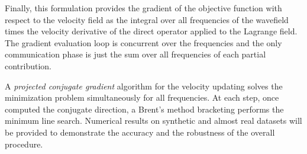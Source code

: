 \documentclass{report}
\begin{document}
Finally, this formulation provides the
gradient of the objective function with respect to the velocity field as the
integral over all frequencies of the wavefield times the velocity derivative of
the direct operator applied to the Lagrange field. The gradient evaluation loop
is concurrent over the frequencies and the only communication phase is just the
sum over all frequencies of each partial contribution.

A {\em projected conjugate gradient} algorithm for the velocity updating solves
the minimization problem simultaneously for all frequencies. At each step, once
computed the conjugate direction, a Brent's method bracketing performs
the minimum line search. Numerical results on synthetic and almost real
datasets will be provided to demonstrate the accuracy and the robustness of
the overall procedure.
\end{document}
